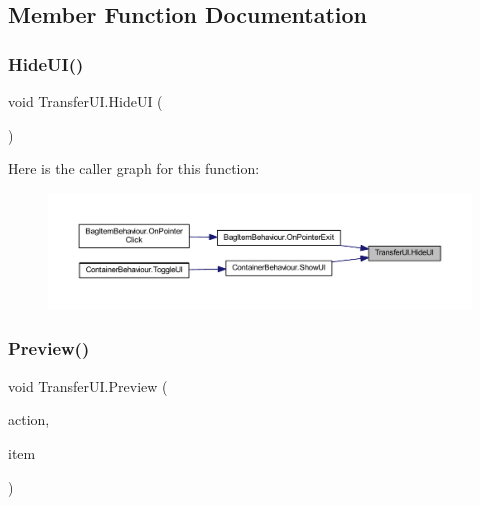 \subsection{Member Function Documentation}
\mbox{\label{class_transfer_u_i_a5c4b5956098b374e40ea084d7fbe7739}} 
\subsubsection{\texorpdfstring{HideUI()}{HideUI()}}
{\footnotesize\ttfamily void Transfer\+U\+I.\+Hide\+UI (\begin{DoxyParamCaption}{ }\end{DoxyParamCaption})}

Here is the caller graph for this function\+:\nopagebreak
\begin{figure}[H]
\begin{center}
\leavevmode
\includegraphics[width=350pt]{class_transfer_u_i_a5c4b5956098b374e40ea084d7fbe7739_icgraph}
\end{center}
\end{figure}
\mbox{\label{class_transfer_u_i_a9d2e7c3708193e3d51fe8539f9c41a75}} 
\subsubsection{\texorpdfstring{Preview()}{Preview()}\hspace{0.1cm}{\footnotesize\ttfamily [1/2]}}
{\footnotesize\ttfamily void Transfer\+U\+I.\+Preview (\begin{DoxyParamCaption}\item[{\mbox{\hyperlink{class_bag_behaviour_aeafbbbda3c9a34d1a73647a8b274788c}{Bag\+Behaviour.\+Actions}}}]{action,  }\item[{\mbox{\hyperlink{class_base_item}{Base\+Item}}}]{item }\end{DoxyParamCaption})}

